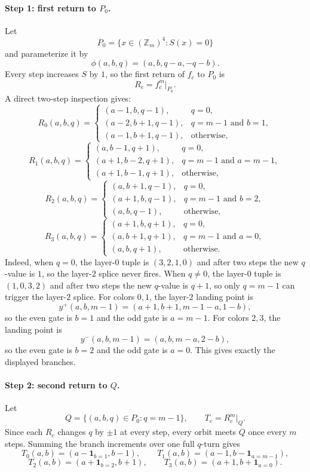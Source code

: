 \documentclass[11pt]{article}
\newcommand{\Zm}{\mathbb Z_m}
\newcommand{\I}{\mathbf 1}
\begin{document}
\paragraph{Step 1: first return to $P_0$.}
Let
\[
P_0=\{x\in (\Zm)^4:S(x)=0\}
\]
and parameterize it by
\[
\phi(a,b,q)=(a,b,q-a,-q-b).
\]
Every step increases $S$ by $1$, so the first return of $f_c$ to $P_0$ is
\[
R_c=f_c^m\big|_{P_0}.
\]
A direct two-step inspection gives:
\[
R_0(a,b,q)=
\begin{cases}
(a-1,b,q-1), & q=0,\\
(a-2,b+1,q-1), & q=m-1\text{ and }b=1,\\
(a-1,b+1,q-1), & \text{otherwise,}
\end{cases}
\]
\[
R_1(a,b,q)=
\begin{cases}
(a,b-1,q+1), & q=0,\\
(a+1,b-2,q+1), & q=m-1\text{ and }a=m-1,\\
(a+1,b-1,q+1), & \text{otherwise,}
\end{cases}
\]
\[
R_2(a,b,q)=
\begin{cases}
(a,b+1,q-1), & q=0,\\
(a+1,b,q-1), & q=m-1\text{ and }b=2,\\
(a,b,q-1), & \text{otherwise,}
\end{cases}
\]
\[
R_3(a,b,q)=
\begin{cases}
(a+1,b,q+1), & q=0,\\
(a,b+1,q+1), & q=m-1\text{ and }a=0,\\
(a,b,q+1), & \text{otherwise.}
\end{cases}
\]
Indeed, when $q=0$, the layer-$0$ tuple is $(3,2,1,0)$ and after two steps the new $q$-value is $1$, so the layer-$2$ splice never fires. When $q\ne 0$, the layer-$0$ tuple is $(1,0,3,2)$ and after two steps the new $q$-value is $q+1$, so only $q=m-1$ can trigger the layer-$2$ splice. For colors $0,1$, the layer-$2$ landing point is
\[
y^+(a,b,m-1)=(a+1,b+1,m-1-a,1-b),
\]
so the even gate is $b=1$ and the odd gate is $a=m-1$. For colors $2,3$, the landing point is
\[
y^-(a,b,m-1)=(a,b,m-a,2-b),
\]
so the even gate is $b=2$ and the odd gate is $a=0$. This gives exactly the displayed branches.

\paragraph{Step 2: second return to $Q$.}
Let
\[
Q=\{(a,b,q)\in P_0:q=m-1\},
\qquad
T_c=R_c^m\big|_Q.
\]
Since each $R_c$ changes $q$ by $\pm1$ at every step, every orbit meets $Q$ once every $m$ steps. Summing the branch increments over one full $q$-turn gives
\[
T_0(a,b)=(a-\I_{b=1},b-1),
\qquad
T_1(a,b)=(a-1,b-\I_{a=m-1}),
\]
\[
T_2(a,b)=(a+\I_{b=2},b+1),
\qquad
T_3(a,b)=(a+1,b+\I_{a=0}).
\]
\end{document}

